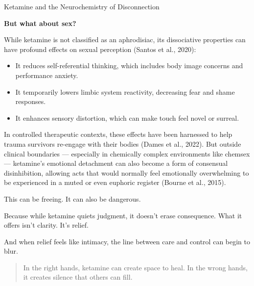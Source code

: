 \begin{TechnicalSidebar}{Ketamine and the Neurochemistry of Disconnection}
  \medskip

  \textbf{But what about sex?}

  \medskip

  While ketamine is not classified as an aphrodisiac, its dissociative properties can have profound effects 
  on sexual perception (Santos et al., 2020):

  \begin{itemize}
    \item It reduces self-referential thinking, which includes body image concerns and performance anxiety.
    \item It temporarily lowers limbic system reactivity, decreasing fear and shame responses.
    \item It enhances sensory distortion, which can make touch feel novel or surreal.
  \end{itemize}

  \medskip

  In controlled therapeutic contexts, these effects have been harnessed to help trauma survivors 
  re-engage with their bodies (Dames et al., 2022).  
  But outside clinical boundaries — especially in chemically complex environments like chemsex —  
  ketamine’s emotional detachment can also become a form of consensual disinhibition, allowing acts that 
  would normally feel emotionally overwhelming to be experienced in a muted or even euphoric register 
  (Bourne et al., 2015).

  \medskip

  This can be freeing.  
  It can also be dangerous.

  \medskip

  Because while ketamine quiets judgment, it doesn’t erase consequence.  
  What it offers isn’t clarity.  
  It’s relief.

  \medskip

  And when relief feels like intimacy, the line between care and control can begin to blur.

  \begin{quote}
    In the right hands, ketamine can create space to heal.  
    In the wrong hands, it creates silence that others can fill.
  \end{quote}

\end{TechnicalSidebar}

